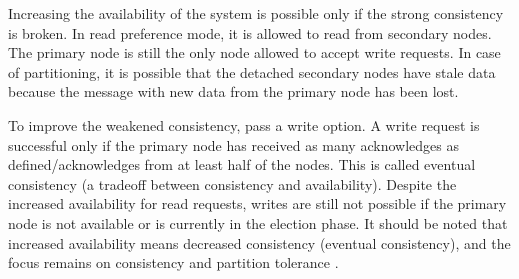 Increasing the availability of the system is possible only if the strong consistency is broken. In read preference mode, it is allowed to read from secondary nodes. The primary node is still the only node allowed to accept write requests. In case of partitioning, it is possible that the detached secondary nodes have stale data because the message with new data from the primary node has been lost.

To improve the weakened consistency, pass a write option. A write request is successful only if the primary node has received as many acknowledges as defined/acknowledges from at least half of the nodes. This is called eventual consistency (a tradeoff between consistency and availability). Despite the increased availability for read requests, writes are still not possible if the primary node is not available or is currently in the election phase. It should be noted that increased availability means decreased consistency (eventual consistency), and the focus remains on consistency and partition tolerance \parencite{katwal:2020}.